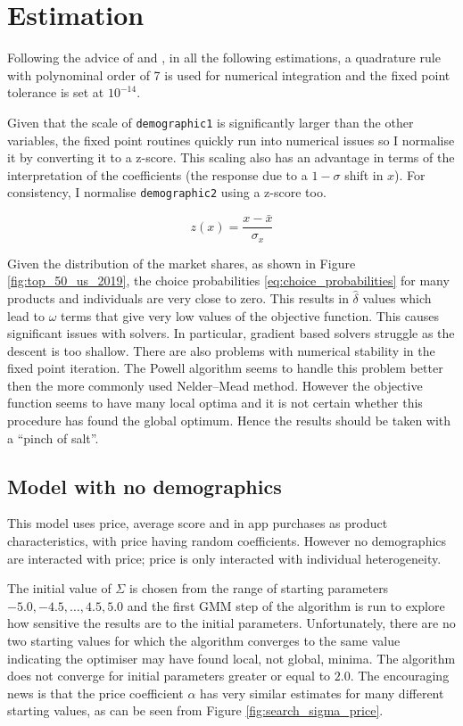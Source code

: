 \documentclass[parskip=half]{scrartcl}
\newcommand{\code}[1]{\texttt{#1}}
\begin{document}
\section{Estimation}

Following the advice of \cite{skrainka2011high} and \cite{dube2012improving}, in all the following estimations, a quadrature rule with polynominal order of 7 is used for numerical integration and the fixed point tolerance is set at \(10^{-14}\).

Given that the scale of \code{demographic1} is significantly larger than the other variables, the fixed point routines quickly run into numerical issues so I normalise it by converting it to a z-score. This scaling also has an advantage in terms of the interpretation of the coefficients (the response due to a \(1-\sigma\) shift in \(x\)). For consistency, I normalise \code{demographic2} using a z-score too.

\begin{equation}
\label{eq:z_score}
z(x) = \frac{x - \bar{x}}{\sigma_x}
\end{equation}

Given the distribution of the market shares, as shown in Figure \ref{fig:top_50_us_2019}, the choice probabilities \eqref{eq:choice_probabilities} for many products and individuals are very close to zero. This results in \(\hat{\delta}\) values which lead to \(\omega\) terms that give very low values of the objective function. This causes significant issues with solvers. In particular, gradient based solvers struggle as the descent is too shallow. There are also problems with numerical stability in the fixed point iteration. The Powell algorithm seems to handle this problem better then the more commonly used Nelder–Mead method. However the objective function seems to have many local optima and it is not certain whether this procedure has found the global optimum. Hence the results should be taken with a ``pinch of salt''.

\subsection{Model with no demographics}

This model uses price, average score and in app purchases as product characteristics, with price having random coefficients. However no demographics are interacted with price; price is only interacted with individual heterogeneity.

The initial value of \(\Sigma\) is chosen from the range of starting parameters \(-5.0, -4.5, \dotsc, 4.5, 5.0\) and the first GMM step of the algorithm is run to explore how sensitive the results are to the initial parameters. Unfortunately, there are no two starting values for which the algorithm converges to the same value indicating the optimiser may have found local, not global, minima. The algorithm does not converge for initial parameters greater or equal to \(2.0\). The encouraging news is that the price coefficient \(\alpha\) has very similar estimates for many different starting values, as can be seen from Figure \ref{fig:search_sigma_price}.
\end{document}

